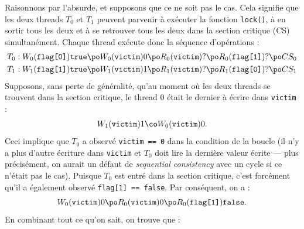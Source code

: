 \begin{myproof}
  Raisonnons par l'absurde, et supposons que ce ne soit pas le cas. Cela
  signifie que les deux threads $T_0$ et $T_1$ peuvent parvenir à exécuter la
  fonction \texttt{lock()}, à en sortir tous les deux et à se retrouver
  tous les deux dans la section critique (CS) simultanément. Chaque thread
  exécute donc la séquence d'opérations :
  \begin{align*}
    T_0 &: W_0(\texttt{flag[0]}) \texttt{true} \po  W_0(\texttt{victim}) 0 \po R_0(\texttt{victim}) ?  \po  R_0(\texttt{flag[1]}) ? \po CS_0 \\
    T_1 &: W_1(\texttt{flag[1]}) \texttt{true} \po  W_1(\texttt{victim}) 1  \po R_1(\texttt{victim}) ? \po R_1(\texttt{flag[0]}) ? \po CS_1
  \end{align*}
  Supposons, sans perte de généralité, qu'au moment où les deux threads se
  trouvent dans la section critique, le thread 0 était le dernier à écrire dans
  \texttt{victim} :
  \[
    W_1(\texttt{victim}) 1 \co W_0(\texttt{victim}) 0.
  \]
  Ceci implique que $T_0$ a observé \texttt{victim == 0} dans la
  condition de la boucle (il n'y a plus d'autre écriture dans \texttt{victim} et
  $T_0$ doit lire la dernière valeur écrite --- plus précisément, on aurait un
  défaut de \emph{sequential consistency} avec un cycle si ce n'était pas le
  cas). Puisque $T_0$ est entré dans la section critique, c'est forcément qu'il
  a également observé \texttt{flag[1] == false}. Par conséquent, on a :
  \[
    W_0(\texttt{victim}) 0 \po R_0(\texttt{victim}) 0 \po R_0(\texttt{flag[1]}) \texttt{false}.
  \]
  En combinant tout ce qu'on sait, on trouve que :

  \begin{center}
\end{center}
\end{myproof}
